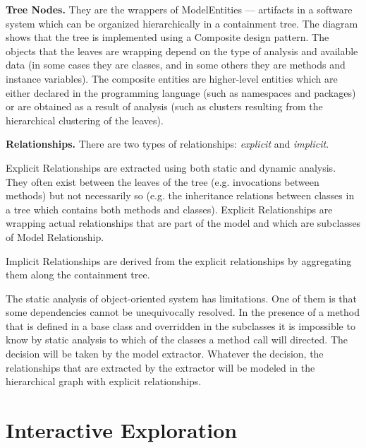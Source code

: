 \documentclass[preprint,12pt]{elsarticle}
\begin{document}
\begin{description}

\item {\bf Tree Nodes.} They are the wrappers of ModelEntities --- artifacts in a software system which can be organized hierarchically in a containment tree. The diagram shows that the tree is implemented using a Composite design pattern. The objects that the leaves are wrapping depend on the type of analysis and available data (in some cases they are classes, and in some others they are methods and instance variables). The composite entities are higher-level entities which are either declared in the programming language (such as namespaces and packages) or are obtained as a result of analysis (such as clusters resulting from the hierarchical clustering of the leaves).

\item {\bf Relationships.} There are two types of relationships: {\em explicit} and {\em implicit}.

Explicit Relationships are extracted using both static and dynamic analysis. They often exist between the leaves of the tree (e.g. invocations between methods) but not necessarily so (e.g. the inheritance relations between classes in a tree which contains both methods and classes). Explicit Relationships are wrapping actual relationships that are part of the model and which are subclasses of Model Relationship.

Implicit Relationships are derived from the explicit relationships by aggregating them along the containment tree. 

\end{description}

The static analysis of object-oriented system has limitations. One of them is that some dependencies cannot be unequivocally resolved. In the presence of a method that is defined in a base class and overridden in the subclasses it is impossible to know by static analysis to which of the classes a method call will directed. The decision will be taken by the model extractor. Whatever the decision, the relationships that are extracted by the extractor will be modeled in the hierarchical graph with explicit relationships.

\section {Interactive Exploration} \label {sec:interact}
\end{document}
